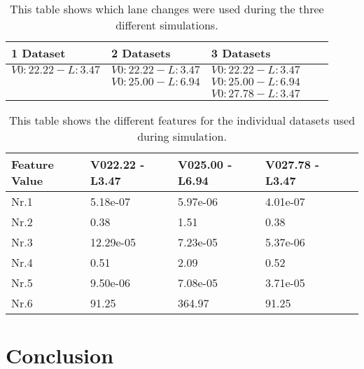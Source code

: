 \begin{table}[h!]
	\centering
	\begin{tabular}{@{}llllr@{}} \toprule
		1 Dataset    & 2 Datasets & 3 Datasets\\ \midrule
     $V0:22.22 - L:3.47$  & $V0:22.22 - L:3.47$    & $V0:22.22 - L:3.47$ 		\\
           			 & $V0:25.00 - L:6.94$      & $V0:25.00 - L:6.94$      \\
	        		 &        & $V0:27.78 - L:3.47$      \\ \bottomrule
	\end{tabular}
	\caption{This table shows which lane changes were used during the three different simulations.}
	\label{tab:datasets_overview}
\end{table} 



\begin{table}[h!]
	\centering
	\begin{tabular}{@{}llllr@{}} \toprule
	\textbf{Feature Value}     & V022.22 - L3.47 & V025.00 - L6.94 & V027.78 - L3.47\\ \midrule
		Nr.1       		  &5.18e-07       & 5.97e-06  & 4.01e-07 		\\
		Nr.2              & 0.38       & 1.51       & 0.38       \\
		Nr.3              & 12.29e-05  & 7.23e-05      & 5.37e-06      \\
		Nr.4              & 0.51       & 2.09       &   0.52    \\
		Nr.5              & 9.50e-06       & 7.08e-05       & 3.71e-05       \\
		Nr.6              & 91.25      & 364.97       & 91.25       \\ \bottomrule
	\end{tabular}
	\caption{This table shows the different features for the individual datasets used during simulation.}
	\label{tab:indi_features}
\end{table} 














\section{Conclusion}


